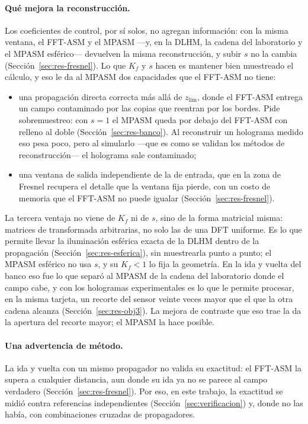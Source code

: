 \paragraph{Qué mejora la reconstrucción.} Los coeficientes de control, por sí
solos, no agregan información: con la misma ventana, el FFT-ASM y el MPASM
---y, en la DLHM, la cadena del laboratorio y el MPASM esférico--- devuelven
la misma reconstrucción, y subir $s$ no la cambia
(Sección~\ref{sec:res-fresnel}). Lo que $K_f$ y $s$ hacen es mantener bien
muestreado el cálculo, y eso le da al MPASM dos capacidades que el FFT-ASM
no tiene:
\begin{itemize}
  \item una propagación directa correcta más allá de $z_\mathrm{lim}$, donde el
  FFT-ASM entrega un campo contaminado por las copias que reentran por los
  bordes. Pide sobremuestreo: con $s = 1$ el MPASM queda por debajo del
  FFT-ASM con relleno al doble (Sección~\ref{sec:res-banco}). Al reconstruir
  un holograma medido eso pesa poco, pero al simularlo ---que es como se
  validan los métodos de reconstrucción--- el holograma sale contaminado;
  \item una ventana de salida independiente de la de entrada, que en la zona
  de Fresnel recupera el detalle que la ventana fija pierde, con un costo de
  memoria que el FFT-ASM no puede igualar (Sección~\ref{sec:res-fresnel}).
\end{itemize}
La tercera ventaja no viene de $K_f$ ni de $s$, sino de la forma matricial
misma: matrices de transformada arbitrarias, no solo las de una DFT uniforme.
Es lo que permite llevar la iluminación esférica exacta de la DLHM dentro de
la propagación (Sección~\ref{sec:res-esferica}), sin muestrearla punto a
punto; el MPASM esférico no usa $s$, y su $K_f < 1$ lo fija la geometría. En la
ida y vuelta del banco eso fue lo que separó al MPASM de la cadena del
laboratorio donde el campo cabe, y con los hologramas experimentales es lo que
le permite procesar, en la misma tarjeta, un recorte del sensor veinte veces
mayor que el que la otra cadena alcanza (Sección~\ref{sec:res-obj3}). La
mejora de contraste que eso trae la da la apertura del recorte mayor; el MPASM
la hace posible.

\paragraph{Una advertencia de método.} La ida y vuelta con un mismo
propagador no valida su exactitud: el FFT-ASM la supera a cualquier distancia,
aun donde su ida ya no se parece al campo verdadero
(Sección~\ref{sec:res-fresnel}). Por eso, en este trabajo, la exactitud se
midió contra referencias independientes (Sección~\ref{sec:verificacion}) y,
donde no las había, con combinaciones cruzadas de propagadores.


